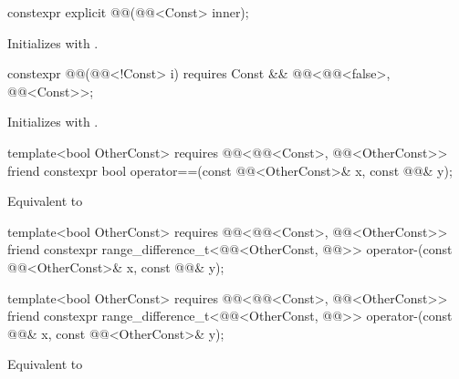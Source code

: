 \begin{itemdecl}
constexpr explicit @@(@@<Const> inner);
\end{itemdecl}

\begin{itemdescr}
\pnum
\effects
Initializes  with .
\end{itemdescr}

\begin{itemdecl}
constexpr @@(@@<!Const> i)
  requires Const && @@<@@<false>, @@<Const>>;
\end{itemdecl}

\begin{itemdescr}
\pnum
\effects
Initializes  with .
\end{itemdescr}

\begin{itemdecl}
template<bool OtherConst>
  requires @@<@@<Const>, @@<OtherConst>>
friend constexpr bool operator==(const @@<OtherConst>& x, const @@& y);
\end{itemdecl}

\begin{itemdescr}
\pnum
\effects
Equivalent to 
\end{itemdescr}

\begin{itemdecl}
template<bool OtherConst>
  requires @@<@@<Const>, @@<OtherConst>>
friend constexpr range_difference_t<@@<OtherConst, @@>>
  operator-(const @@<OtherConst>& x, const @@& y);

template<bool OtherConst>
  requires @@<@@<Const>, @@<OtherConst>>
friend constexpr range_difference_t<@@<OtherConst, @@>>
  operator-(const @@& x, const @@<OtherConst>& y);
\end{itemdecl}

\begin{itemdescr}
\pnum
\effects
Equivalent to 
\end{itemdescr}

